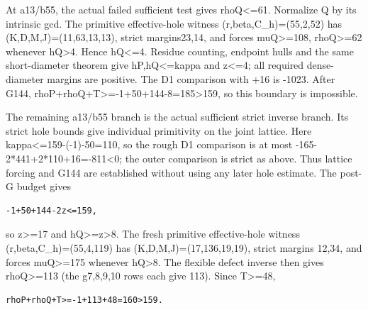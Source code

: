 \documentclass[10pt,a4paper]{article}
\theoremstyle{definition}
\begin{document}
At a13/b55,\allowbreak{} the actual failed sufficient test gives rhoQ\textless=\allowbreak{}61.
Normalize Q by its intrinsic gcd. The primitive effective-hole witness
(r,\allowbreak{}beta,\allowbreak{}C\_\allowbreak{}h)=\allowbreak{}(55,\allowbreak{}2,\allowbreak{}52) has (K,\allowbreak{}D,\allowbreak{}M,\allowbreak{}J)=\allowbreak{}(11,\allowbreak{}63,\allowbreak{}13,\allowbreak{}13),\allowbreak{} strict
margins23,\allowbreak{}14,\allowbreak{} and forces muQ\textgreater=\allowbreak{}108,\allowbreak{} rhoQ\textgreater=\allowbreak{}62
whenever hQ\textgreater4. Hence hQ\textless=\allowbreak{}4. Residue counting,\allowbreak{}
endpoint hulls and the same short-diameter theorem give
hP,\allowbreak{}hQ\textless=\allowbreak{}kappa and z\textless=\allowbreak{}4; all required dense-diameter
margins are positive. The D1 comparison with +\allowbreak{}16 is -1023. After G144,\allowbreak{}
rhoP+\allowbreak{}rhoQ+\allowbreak{}T\textgreater=\allowbreak{}-1+\allowbreak{}50+\allowbreak{}144-8=\allowbreak{}185\textgreater159,\allowbreak{} so this boundary
is impossible.

The remaining a13/b55 branch is the actual sufficient strict inverse
branch. Its strict hole bounds give individual primitivity on the joint
lattice. Here kappa\textless=\allowbreak{}159-(-1)-50=\allowbreak{}110,\allowbreak{} so the rough D1 comparison
is at most -165-2*441+\allowbreak{}2*110+\allowbreak{}16=\allowbreak{}-811\textless0; the outer comparison is
strict as above. Thus lattice forcing and G144 are established without
using any later hole estimate. The post-G budget gives

\begin{lstlisting}
-1+50+144-2z<=159,
\end{lstlisting}

so z\textgreater=\allowbreak{}17 and hQ\textgreater=\allowbreak{}z\textgreater8. The fresh
primitive effective-hole witness (r,\allowbreak{}beta,\allowbreak{}C\_\allowbreak{}h)=\allowbreak{}(55,\allowbreak{}4,\allowbreak{}119) has
(K,\allowbreak{}D,\allowbreak{}M,\allowbreak{}J)=\allowbreak{}(17,\allowbreak{}136,\allowbreak{}19,\allowbreak{}19),\allowbreak{} strict margins 12,\allowbreak{}34,\allowbreak{} and forces
muQ\textgreater=\allowbreak{}175 whenever hQ\textgreater8. The flexible defect
inverse then gives rhoQ\textgreater=\allowbreak{}113 (the g7,\allowbreak{}8,\allowbreak{}9,\allowbreak{}10 rows each give
113). Since T\textgreater=\allowbreak{}48,\allowbreak{}

\begin{lstlisting}
rhoP+rhoQ+T>=-1+113+48=160>159.
\end{lstlisting}
\end{document}
